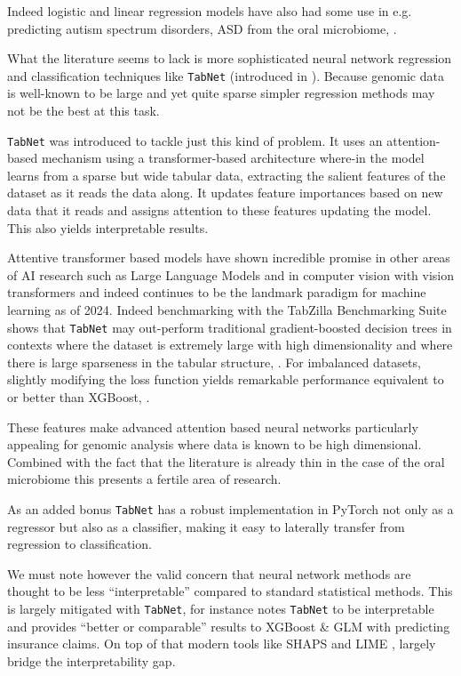 \documentclass{article}
\begin{document}
\begin{multicols}{2}
Indeed logistic and linear regression models have also had some use in e.g. predicting autism spectrum disorders, ASD from the oral microbiome, \cite{li_genetic_2022}. 

What the literature seems to lack is more sophisticated neural network regression and classification techniques like \texttt{TabNet} (introduced in \cite{arik_tabnet_2021}). Because genomic data is well-known to be large and yet quite sparse simpler regression methods may not be the best at this task. 

\texttt{TabNet} was introduced to tackle just this kind of problem. It uses an attention-based mechanism using a transformer-based \cite{vaswani_attention_2017} architecture where-in the model learns from a sparse but wide tabular data, extracting the salient features of the dataset as it reads the data along. It updates feature importances based on new data that it reads and assigns attention to these features updating the model. This also yields interpretable results.

Attentive transformer based models have shown incredible promise in other areas of AI research such as Large Language Models and in computer vision with vision transformers and indeed continues to be the landmark paradigm for machine learning as of 2024. Indeed benchmarking with the TabZilla Benchmarking Suite shows that \texttt{TabNet} may out-perform traditional gradient-boosted decision trees in contexts where the dataset is extremely large with high dimensionality and where there is large sparseness in the tabular structure, \cite{mcelfresh2023neural}. For imbalanced datasets, slightly modifying the loss function yields remarkable performance equivalent to or better than XGBoost, \cite{kanasz_clash_nodate}.

These features make advanced attention based neural networks particularly appealing for genomic analysis where data is known to be high dimensional. Combined with the fact that the literature is already thin in the case of the oral microbiome this presents a fertile area of research. 

As an added bonus \texttt{TabNet} has a robust implementation in PyTorch \cite{noauthor_pytorch-tabnet_nodate} not only as a regressor but also as a classifier, making it easy to laterally transfer from regression to classification.

We must note however the valid concern that neural network methods are thought to be less ``interpretable'' compared to standard statistical methods. This is largely mitigated with \texttt{TabNet}, for instance \cite{MCDONNELL2023119543} notes \texttt{TabNet} to be interpretable and provides ``better or comparable'' results to XGBoost \& GLM with predicting insurance claims. On top of that modern tools like SHAPS \cite{lundberg_unified_2017} and LIME \cite{10.1145/2939672.2939778}, largely bridge the interpretability gap.


\end{multicols}
\end{document}
